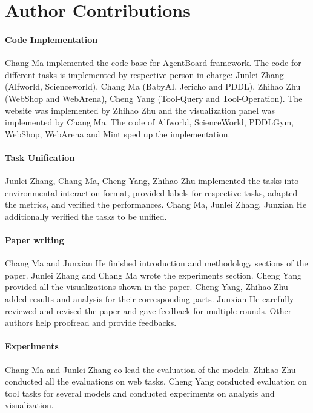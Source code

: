 \section{Author Contributions \label{appendix:author_contributions}}

\paragraph{Code Implementation} Chang Ma implemented the code base for AgentBoard framework. The code for different tasks is implemented by respective person in charge: Junlei Zhang (Alfworld, Scienceworld), Chang Ma (BabyAI, Jericho and PDDL), Zhihao Zhu (WebShop and WebArena), Cheng Yang (Tool-Query and Tool-Operation). The website was implemented by Zhihao Zhu and the visualization panel was implemented by Chang Ma. The code of Alfworld, ScienceWorld, PDDLGym, WebShop, WebArena and Mint sped up the implementation.

\paragraph{Task Unification} Junlei Zhang,  Chang Ma, Cheng Yang, Zhihao Zhu implemented the tasks into environmental interaction format, provided labels for respective tasks, adapted the metrics, and verified the performances. Chang Ma, Junlei Zhang, Junxian He additionally verified the tasks to be unified. 

\paragraph{Paper writing} Chang Ma and Junxian He finished introduction and methodology sections of the paper. Junlei Zhang and Chang Ma wrote the experiments section. Cheng Yang provided all the visualizations shown in the paper. Cheng Yang, Zhihao Zhu added results and analysis for their corresponding parts. Junxian He  carefully reviewed and revised the paper and gave
feedback for multiple rounds. Other authors help proofread and provide feedbacks.

\paragraph{Experiments} Chang Ma and Junlei Zhang co-lead the evaluation of the models. Zhihao Zhu conducted all the evaluations on web tasks. Cheng Yang conducted evaluation on tool tasks for several models and conducted experiments on analysis and visualization. 

